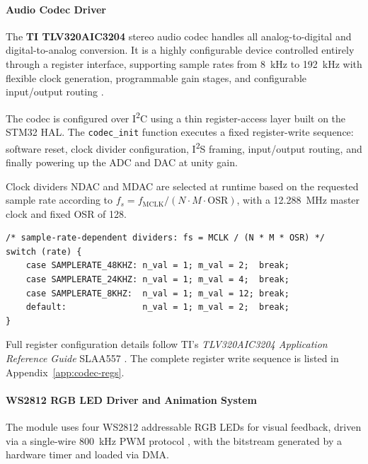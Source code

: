\paragraph{Audio Codec Driver}

The \textbf{TI TLV320AIC3204} stereo audio codec handles all analog-to-digital and digital-to-analog conversion. 
It is a highly configurable device controlled entirely through a register interface, supporting sample rates from 8~kHz to 192~kHz with flexible clock generation, programmable gain stages, and configurable input/output routing \cite{texasinstrumentsTlv320aic3204Datasheet}.

The codec is configured over I\textsuperscript{2}C using a thin register-access layer built on the STM32 HAL. 
The \texttt{codec\_init} function executes a fixed register-write sequence: software reset, clock divider configuration, I\textsuperscript{2}S framing, input/output routing, and finally powering up the ADC and DAC at unity gain.
 
Clock dividers NDAC and MDAC are selected at runtime based on the requested sample rate according to $f_s = f_\text{MCLK} / (N \cdot M \cdot \text{OSR})$, with a \qty{12.288}{MHz} master clock and fixed \ac{OSR} of 128. 

\begin{listing}[h]
\begin{verbatim}
/* sample-rate-dependent dividers: fs = MCLK / (N * M * OSR) */
switch (rate) {
    case SAMPLERATE_48KHZ: n_val = 1; m_val = 2;  break;
    case SAMPLERATE_24KHZ: n_val = 1; m_val = 4;  break;
    case SAMPLERATE_8KHZ:  n_val = 1; m_val = 12; break;
    default:               n_val = 1; m_val = 2;  break;
}
\end{verbatim}
\caption{TLV320AIC3204 driver -- clock divider configuration with configurable samplerate}
\label{lst:codec_clk}
\end{listing}

Full register configuration details follow TI's \textit{TLV320AIC3204 Application Reference Guide} SLAA557 \cite[pp.~96--128]{TLV320AIC3204ApplicationReference2012}.
The complete register write sequence is listed in Appendix~\ref{app:codec-regs}.

\paragraph{WS2812 RGB LED Driver and Animation System}

The module uses four WS2812 addressable RGB LEDs for visual feedback, driven via a single-wire \qty{800}{kHz} PWM protocol \cite{WS2812Bdatasheet}, with the bitstream generated by a hardware timer and loaded via DMA.

